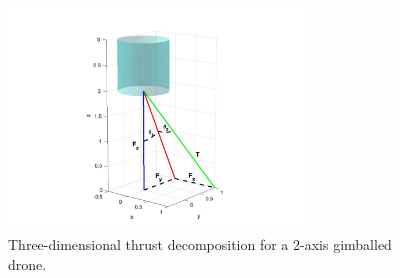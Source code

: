 \documentclass[]{article}
\begin{document}
	\begin{figure}[H]
	\centering
	\includegraphics[width=0.7\textwidth]{graph3d.jpg}
	\caption{Three-dimensional thrust decomposition for a 2-axis gimballed drone.}
	\label{fig:3dgraph}
	\end{figure}
\end{document}

